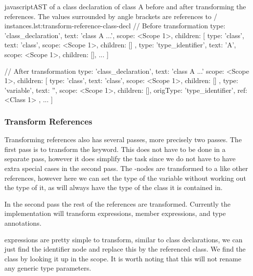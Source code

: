 \begin{code}{javascript}{AST of a class declaration of class A before and after transforming the references. The values surrounded by angle brackets are references to / instances.}{lst:transform-reference-class-decl}
    // Before transformation
    {
        type: 'class_declaration',
        text: 'class A ...',
        scope: <Scope 1>,
        children: [
            {
                type: 'class',
                text: 'class',
                scope: <Scope 1>,
                children: []
            }, {
                type: 'type_identifier',
                text: 'A',
                scope: <Scope 1>,
                children: [],
            }
            ...
        ]
    }

    // After transformation
    {
        type: 'class_declaration',
        text: 'class A ...'
        scope: <Scope 1>,
        children: [
            {
                type: 'class',
                text: 'class',
                scope: <Scope 1>,
                children: []
            }, {
                type: 'variable',
                text: '',
                scope: <Scope 1>,
                children: [],
                origType: 'type_identifier',
                ref: <Class 1>
            },
            ...
        ]
    }
\end{code}

\subsubsection{Transform References}

Transforming references also has several passes, more precisely two passes.
The first pass is to transform the  keyword.
This does not have to be done in a separate pass, however it does simplify the task since we do not have to have extra special cases in the second pass.
The -nodes are transformed to a  like other references, however here we can set the type of the variable without working out the type of it, as  will always have the type of the class it is contained in.

In the second pass the rest of the references are transformed.
Currently the implementation will transform  expressions, member expressions, and type annotations.

 expressions are pretty simple to transform, similar to class declarations, we can just find the identifier node and replace this by the referenced class.
We find the class by looking it up in the scope.
It is worth noting that this will not rename any generic type parameters.

